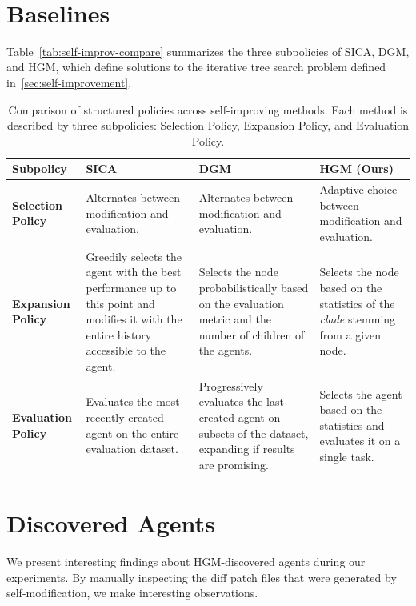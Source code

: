 \documentclass{article}
\begin{document}
\
\newpage
\section{Baselines}\label{app:baselines}



Table~\ref{tab:self-improv-compare} summarizes the three subpolicies of SICA, DGM, and HGM, which define solutions to the iterative tree search problem defined in~\ref{sec:self-improvement}.
\begin{table}[htbp]
\centering
\renewcommand{\arraystretch}{1.25}
\begin{tabularx}{\textwidth}{p{2.2cm} X X X}

\toprule
\textbf{Subpolicy} & \textbf{SICA} & \textbf{DGM} & \textbf{HGM (Ours)} \\
\midrule
\textbf{Selection Policy} 
& Alternates between modification and evaluation. 
& Alternates between modification and evaluation. 
& Adaptive choice between modification and evaluation. \\
\midrule
\textbf{Expansion Policy} 
& Greedily selects the agent with the best performance up to this point and modifies it with the entire history accessible to the agent. 
& Selects the node probabilistically based on the evaluation metric and the number of children of the agents. 
& Selects the node based on the statistics of the \emph{clade} stemming from a given node.\\
\midrule
\textbf{Evaluation Policy} 
& Evaluates the most recently created agent on the entire evaluation dataset. 
& Progressively evaluates the last created agent on subsets of the dataset, expanding if results are promising. 
& Selects the agent based on the statistics and evaluates it on a single task. \\
\bottomrule
\end{tabularx}
\caption{Comparison of structured policies across self-improving methods. Each method is described by three subpolicies: Selection Policy, Expansion Policy, and Evaluation Policy. }
\label{tab:structured_policy}
\end{table}

\newpage
\section{Discovered Agents}
We present interesting findings about HGM-discovered agents during our experiments. 
By manually inspecting the diff patch files that were generated by self-modification, we make interesting observations.
\end{document}
